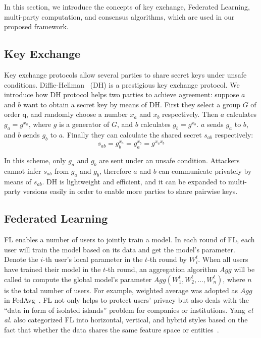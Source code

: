 In this section, we introduce the concepts of key exchange, Federated Learning, multi-party computation, and consensus algorithms, which are used in our proposed framework.

\subsection{Key Exchange}
Key exchange protocols allow several parties to share secret keys under unsafe conditions. Diffie-Hellman~\cite{DH} (DH) is a prestigious key exchange protocol. We introduce how DH protocol helps two parties to achieve agreement: suppose $a$ and $b$ want to obtain a secret key by means of DH. First they select a group $G$ of order q, and randomly choose a number $x_a$ and $x_b$ respectively. Then $a$ calculates $g_a = g^{x_a}$, where $g$ is a generator of $G$, and $b$ calculates $g_b = g^{x_b}$. $a$ sends $g_a$ to $b$, and $b$ sends $g_b$ to $a$. Finally they can calculate the shared secret $s_{ab}$ respectively:
$$ s_{ab} = g_b^{x_a}  = g_a^{x_b} = g^{x_ax_b}$$

In this scheme, only $g_a$ and $g_b$ are sent under an unsafe condition. Attackers cannot infer $s_{ab}$ from $g_a$ and $g_b$, therefore $a$ and $b$ can communicate privately by means of $s_{ab}$. DH is lightweight and efficient, and it can be expanded to multi-party versions easily in order to enable more parties to share pairwise keys.

\subsection{Federated Learning}
FL enables a number of users to jointly train a model. In each round of FL, each user will train the model based on its data and get the model's parameter. Denote the $i$-th user's local parameter in the $t$-th round by $W_i^t$. When all users have trained their model in the $t$-th round, an aggregation algorithm $Agg$ will be called to compute the global model's parameter $Agg(W_1^t, W_2^t, ..., W_n^t)$, where $n$ is the total number of users. For example, weighted average was adopted as $Agg$ in FedAvg~\cite{mcmahan2016communicationefficient}. FL not only helps to protect users' privacy but also deals with the ``data in form of isolated islands'' problem for companies or institutions. Yang \emph{et al}. also categorized FL into horizontal, vertical, and hybrid styles based on the fact that whether the data shares the same feature space or entities~\cite{yang2019federated}. 

